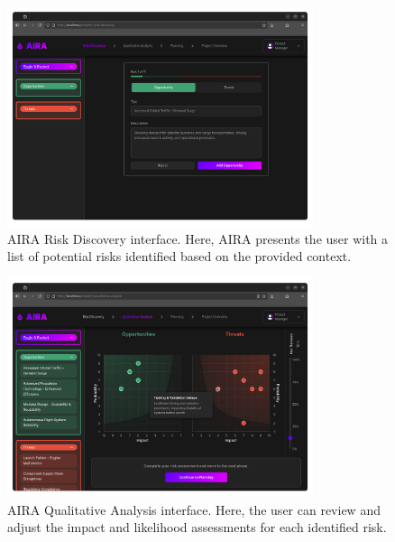 \begin{figure}[H]
    \centering
    \includegraphics[width=0.8\textwidth]{figures/screenshots/risk_discovery.png}
    \caption{AIRA Risk Discovery interface. Here, AIRA
    presents the user with a list of potential risks
    identified based on the provided context.}
    \label{fig:risk_discovery}
\end{figure}

\begin{figure}[H]
    \centering
    \includegraphics[width=0.8\textwidth]{figures/screenshots/qualitative_analysis.png}
    \caption{AIRA Qualitative Analysis interface. Here,
    the user can review and adjust the impact and
    likelihood assessments for each identified risk.}
    \label{fig:qualitative_analysis}
\end{figure}

